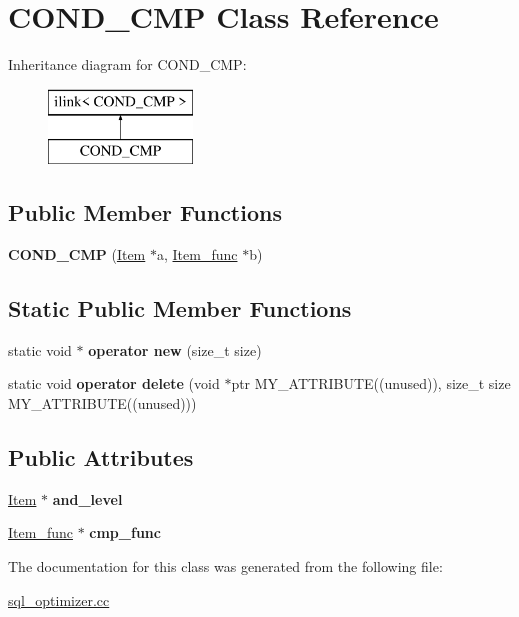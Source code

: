 \hypertarget{classCOND__CMP}{}\section{C\+O\+N\+D\+\_\+\+C\+MP Class Reference}
\label{classCOND__CMP}
Inheritance diagram for C\+O\+N\+D\+\_\+\+C\+MP\+:\begin{figure}[H]
\begin{center}
\leavevmode
\includegraphics[height=2.000000cm]{classCOND__CMP}
\end{center}
\end{figure}
\subsection*{Public Member Functions}
\begin{DoxyCompactItemize}
\item 
\mbox{\label{classCOND__CMP_a6852583381fc784d786935d5118b3f65}} 
{\bfseries C\+O\+N\+D\+\_\+\+C\+MP} (\mbox{\hyperlink{classItem}{Item}} $\ast$a, \mbox{\hyperlink{classItem__func}{Item\+\_\+func}} $\ast$b)
\end{DoxyCompactItemize}
\subsection*{Static Public Member Functions}
\begin{DoxyCompactItemize}
\item 
\mbox{\label{classCOND__CMP_a5e9ea1d750e834221439a6ff5b1de6ea}} 
static void $\ast$ {\bfseries operator new} (size\+\_\+t size)
\item 
\mbox{\label{classCOND__CMP_a0b002e0f7970178fc875d3d4107000ec}} 
static void {\bfseries operator delete} (void $\ast$ptr M\+Y\+\_\+\+A\+T\+T\+R\+I\+B\+U\+TE((unused)), size\+\_\+t size M\+Y\+\_\+\+A\+T\+T\+R\+I\+B\+U\+TE((unused)))
\end{DoxyCompactItemize}
\subsection*{Public Attributes}
\begin{DoxyCompactItemize}
\item 
\mbox{\label{classCOND__CMP_af4a033fa3889b96c55332c6614a39e5f}} 
\mbox{\hyperlink{classItem}{Item}} $\ast$ {\bfseries and\+\_\+level}
\item 
\mbox{\label{classCOND__CMP_a77c1fddf73ade76ab29a1f902d1e7290}} 
\mbox{\hyperlink{classItem__func}{Item\+\_\+func}} $\ast$ {\bfseries cmp\+\_\+func}
\end{DoxyCompactItemize}


The documentation for this class was generated from the following file\+:\begin{DoxyCompactItemize}
\item 
\mbox{\hyperlink{sql__optimizer_8cc}{sql\+\_\+optimizer.\+cc}}\end{DoxyCompactItemize}
